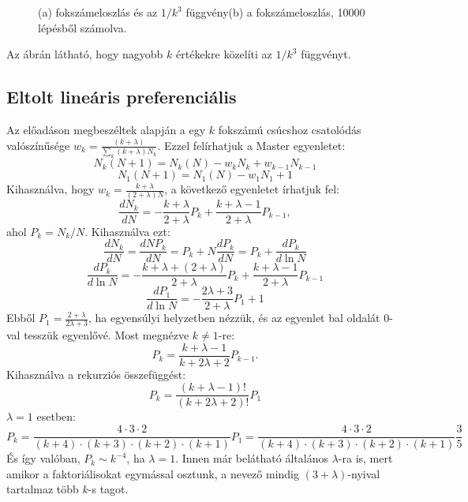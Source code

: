\documentclass[12pt]{article}
\begin{document}
 \begin{figure}[H]
\centering     
{}

\caption{(a) fokszámeloszlás és az $1/k^3$ függvény(b) a fokszámeloszlás, 10000 lépésből számolva.}
\label{fig: k}
\end{figure}
Az ábrán látható, hogy nagyobb $k$ értékekre közelíti az $1/k^3$ függvényt.


\subsection*{Eltolt lineáris preferenciális}
Az előadáson megbeszéltek alapján a egy $k$ fokszámú csúcshoz csatolódás valószínűsége $w_k = \frac{(k+\lambda)}{\sum_k(k+\lambda)N_k}$. Ezzel felírhatjuk a Master egyenletet:
$$N_k(N+1) = N_k(N)-w_kN_k+w_{k-1} N_{k-1}$$
$$N_1(N+1) = N_1(N) - w_1N_1+1$$
Kihasználva, hogy $w_k=\frac{k+\lambda}{(2+\lambda)N}$, a következő egyenletet írhatjuk fel:
$$\frac{dN_k}{dN} = -\frac{k+\lambda}{2+\lambda}P_k + \frac{k+\lambda-1}{2+\lambda}P_{k-1}, $$
ahol $P_k = N_k/N$. Kihasználva ezt:
$$\frac{dN_k}{dN} = \frac{dNP_k}{dN} = P_k +N\frac{dP_k}{dN} = P_k + \frac{dP_k}{d\ln{N}}$$
$$\frac{dP_k}{d\ln{N}} = -\frac{k+\lambda + (2+\lambda)}{2+\lambda}P_k + \frac{k+\lambda -1}{2+\lambda}P_{k-1}$$
$$\frac{dP_1}{d\ln{N}} = -\frac{2\lambda + 3}{2+\lambda}P_1 + 1$$
Ebből $P_1 =\frac{2+\lambda}{2\lambda + 3} $, ha egyensúlyi helyzetben nézzük, és az egyenlet bal oldalát $0$-val tesszük egyenlővé. Most megnézve $k\neq 1$-re:
$$P_k = \frac{k+\lambda -1}{k + 2\lambda + 2}P_{k-1}.$$
Kihasználva a rekurziós összefüggést:
$$P_k = \frac{(k+\lambda -1)!}{(k+2\lambda + 2)!}P_1$$
$\lambda = 1$ esetben:
$$P_k = \frac{4\cdot3\cdot 2}{(k +4)\cdot(k+3)\cdot(k+2)\cdot (k+1)}P_1 =  \frac{4\cdot3\cdot 2}{(k +4)\cdot(k+3)\cdot(k+2)\cdot (k+1)}\frac{3}{5}$$
És így valóban, $P_k \sim k^{-4}$, ha $\lambda = 1$. Innen már belátható általános $\lambda$-ra is, mert amikor a faktoriálisokat egymással osztunk, a nevező mindig $(3+\lambda)$-nyival tartalmaz több $k$-s tagot. 
\end{document}
